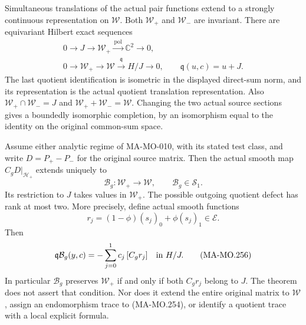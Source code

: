 Simultaneous translations of the actual pair functions extend
to a strongly continuous representation on \(\mathcal W\).
Both \(\mathcal W_+\) and \(\mathcal W_-\) are invariant.
There are equivariant Hilbert exact sequences
\[
 \begin{gathered}
 0\longrightarrow J\longrightarrow\mathcal W_+
       \xrightarrow{\,\operatorname{pol}\,}\mathbb C^2
       \longrightarrow0,\\
 0\longrightarrow\mathcal W_+\longrightarrow\mathcal W
       \xrightarrow{\,\mathfrak q\,}H/J\longrightarrow0,
       \qquad \mathfrak q(u,c)=u+J.
 \end{gathered}
 \tag{MA-MO.253}
\]
The last quotient identification is isometric in the displayed
direct-sum norm, and its representation is the actual quotient
translation representation. Also
\(\mathcal W_+\cap\mathcal W_-=J\) and
\(\mathcal W_++\mathcal W_-=\mathcal W\).
Changing the two actual source sections gives a boundedly
isomorphic completion, by an isomorphism equal to the identity
on the original common-sum space.

Assume either analytic regime of MA-MO-010, with its stated test
class, and write \(D=P_+-P_-\) for the original source matrix.
Then the actual smooth map \(C_gD|_{\mathscr H_+}\) extends
uniquely to
\[
       \mathcal B_g:\mathcal W_+\longrightarrow\mathcal W,
                      \qquad \mathcal B_g\in\mathcal S_1.
 \tag{MA-MO.254}
\]
Its restriction to \(J\) takes values in \(\mathcal W_+\).
The possible outgoing quotient defect has rank at most two.
More precisely, define actual smooth functions
\[
       r_j=(1-\phi)(s_j)_0+\phi(s_j)_1\in\mathcal E.
 \tag{MA-MO.255}
\]
Then
\[
       \mathfrak q\mathcal B_g(y,c)
             =-\sum_{j=0}^1c_j\,[C_gr_j]\quad\hbox{in }H/J.
 \tag{MA-MO.256}
\]
In particular \(\mathcal B_g\) preserves \(\mathcal W_+\)
if and only if both \(C_gr_j\) belong to \(J\). The theorem
does not assert that condition. Nor does it extend the entire
original matrix to \(\mathcal W\), assign an endomorphism
trace to (MA-MO.254), or identify a quotient trace with a local
explicit formula.

